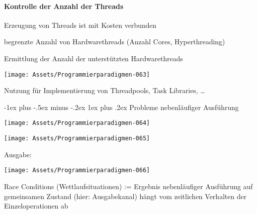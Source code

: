 \documentclass[10pt]{article}
\makeatletter
\renewcommand{\subsubsection}{\@startsection{subsubsection}{3}{0mm}%
                                {-1ex plus -.5ex minus -.2ex}%
                                {1ex plus .2ex}%
                                {\normalfont\small\bfseries}}
\makeatother
\begin{document}
\paragraph{Kontrolle der Anzahl der Threads}
\begin{itemize*}
  \item Erzeugung von Threads ist mit Kosten verbunden
  \item begrenzte Anzahl von Hardwarethreads (Anzahl Cores, Hyperthreading)
  \item Ermittlung der Anzahl der unterstützten Hardwarethreads
\end{itemize*}
\begin{center}
  \texttt{[image: Assets/Programmierparadigmen-063]}
\end{center}
\begin{itemize*}
  \item Nutzung für Implementierung von Threadpools, Task Libraries, …
\end{itemize*}

\subsubsection{Probleme nebenläufiger Ausführung}
\begin{center}
  \texttt{[image: Assets/Programmierparadigmen-064]}
\end{center}
\begin{center}
  \texttt{[image: Assets/Programmierparadigmen-065]}
\end{center}
Ausgabe:
\begin{center}
  \texttt{[image: Assets/Programmierparadigmen-066]}
\end{center}
\color{orange} Race Conditions \color{black}(Wettlaufsituationen) := Ergebnis nebenläufiger Ausführung auf gemeinsamen Zustand (hier: Ausgabekanal) hängt vom zeitlichen Verhalten der Einzeloperationen ab
\end{document}
